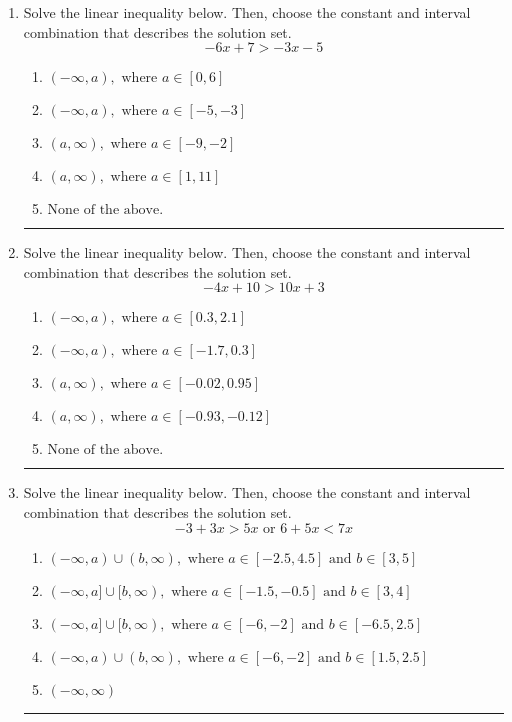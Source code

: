 \documentclass[14pt]{extbook}
\newcommand{\litem}[1]{\item#1\hspace*{-1cm}\rule{\textwidth}{0.4pt}}
\begin{document}
\begin{enumerate}
\litem{
Solve the linear inequality below. Then, choose the constant and interval combination that describes the solution set.\[ -6x + 7 > -3x -5 \]\begin{enumerate}[label=\Alph*.]
\item \( (-\infty, a), \text{ where } a \in [0, 6] \)
\item \( (-\infty, a), \text{ where } a \in [-5, -3] \)
\item \( (a, \infty), \text{ where } a \in [-9, -2] \)
\item \( (a, \infty), \text{ where } a \in [1, 11] \)
\item \( \text{None of the above}. \)

\end{enumerate} }
\litem{
Solve the linear inequality below. Then, choose the constant and interval combination that describes the solution set.\[ -4x + 10 > 10x + 3 \]\begin{enumerate}[label=\Alph*.]
\item \( (-\infty, a), \text{ where } a \in [0.3, 2.1] \)
\item \( (-\infty, a), \text{ where } a \in [-1.7, 0.3] \)
\item \( (a, \infty), \text{ where } a \in [-0.02, 0.95] \)
\item \( (a, \infty), \text{ where } a \in [-0.93, -0.12] \)
\item \( \text{None of the above}. \)

\end{enumerate} }
\litem{
Solve the linear inequality below. Then, choose the constant and interval combination that describes the solution set.\[ -3 + 3 x > 5 x \text{ or } 6 + 5 x < 7 x \]\begin{enumerate}[label=\Alph*.]
\item \( (-\infty, a) \cup (b, \infty), \text{ where } a \in [-2.5, 4.5] \text{ and } b \in [3, 5] \)
\item \( (-\infty, a] \cup [b, \infty), \text{ where } a \in [-1.5, -0.5] \text{ and } b \in [3, 4] \)
\item \( (-\infty, a] \cup [b, \infty), \text{ where } a \in [-6, -2] \text{ and } b \in [-6.5, 2.5] \)
\item \( (-\infty, a) \cup (b, \infty), \text{ where } a \in [-6, -2] \text{ and } b \in [1.5, 2.5] \)
\item \( (-\infty, \infty) \)


\end{enumerate}}
\end{enumerate}
\end{document}
